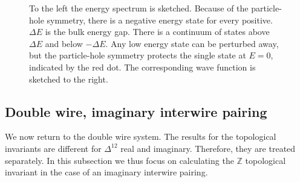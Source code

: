 \begin{figure}
\center
{}
\caption{To the left the energy spectrum is sketched. Because of the particle-hole symmetry, there is a negative energy state for every positive. $\Delta E$ is the bulk energy gap. There is a continuum of states above $\Delta E$ and below $-\Delta E$. Any low energy state can be perturbed away, but the particle-hole symmetry protects the single state at $E = 0$, indicated by the red dot. The corresponding wave function is sketched to the right.}
\label{fig.edgestates}
\end{figure}

\subsection{Double wire, imaginary interwire pairing} \label{subsec.2wires_CSinv_Delta12imag}
We now return to the double wire system. The results for the topological invariants are different for $\Delta^{12}$ real and imaginary. Therefore, they are treated separately. In this subsection we thus focus on calculating the $\mathbb{Z}$ topological invariant in the case of an imaginary interwire pairing. 

